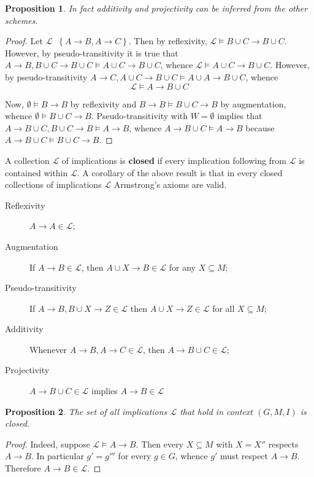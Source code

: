 \documentclass[a4paper]{article}
\newcommand{\obj}[1]{{\left\{ #1 \right \}}}
\newcommand{\Lcal}{\mathcal{L}}
\newtheorem{prop}{Proposition}
\newcommand{\defn}{\mathop{\overset{\Delta}{=}}\nolimits}
\begin{document}
\begin{prop} In fact additivity and projectivity can be inferred from the other schemes.
\end{prop}

\begin{proof}
Let $\Lcal\defn \obj{A\to B, A\to C}$. Then by reflexivity, $\Lcal\models B\cup C\to B\cup C$. However, by pseudo-transitivity it is true that $A\to B, B\cup C\to B\cup C\models A\cup C\to B\cup C$, whence $\Lcal\models A\cup C\to B\cup C$. However, by pseudo-transitivity $A\to C,A\cup C\to B\cup C\models A\cup A\to B\cup C$, whence \[\Lcal\models A\to B\cup C\]

Now, $\emptyset\models B\to B$ by reflexivity and $B\to B\models B\cup C\to B$ by augmentation, whence $\emptyset\models B\cup C\to B$. Pseudo-transitivity with $W=\emptyset$ implies that $A\to B\cup C, B\cup C\to B\models A\to B$, whence $A\to B\cup C\models A\to B$ because $A\to B\cup C \models B\cup C\to B$.
\end{proof}

A collection $\Lcal$ of implications is \textbf{closed} if every implication following from $\Lcal$ is contained within $\Lcal$. A corollary of the above result is that in every closed collections of implications $\Lcal$ Armstrong's axioms are valid.
\begin{description}
	\item[Reflexivity] $A\to A\in \Lcal$;
	\item[Augmentation] If $A\to B\in \Lcal$, then $A\cup X\to B\in \Lcal$ for any $X\subseteq M$;
	\item[Pseudo-transitivity] If $A\to B, B\cup X\to Z\in \Lcal$ then $A\cup X\to Z\in \Lcal$ for all $X\subseteq M$;
	\item[Additivity] Whenever $A\to B, A\to C\in\Lcal$, then $A\to B\cup C\in \Lcal$;
	\item[Projectivity] $A\to B\cup C\in \Lcal$ implies $A\to B\in \Lcal$
\end{description}

\begin{prop} The set of all implications $\Lcal$ that hold in context $(G,M,I)$ is closed.
\end{prop}

\begin{proof}
Indeed, suppose $\Lcal\models A\to B$. Then every $X\subseteq M$ with $X=X''$ respects $A\to B$. In particular $g'=g'''$ for every $g\in G$, whence $g'$ must respect $A\to B$. Therefore $A\to B\in \Lcal$.
\end{proof}
\end{document}

